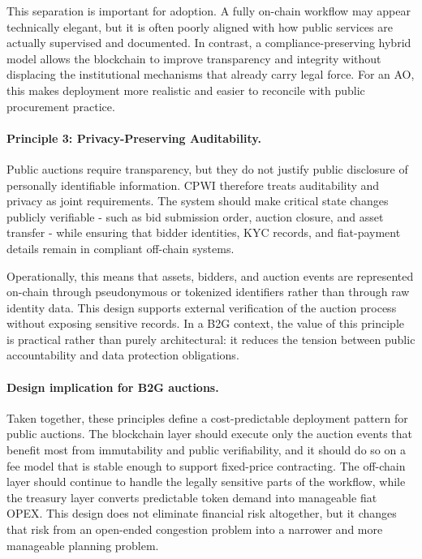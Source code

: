 \documentclass[runningheads]{llncs}
\begin{document}
This separation is important for adoption. A fully on-chain workflow may appear
technically elegant, but it is often poorly aligned with how public services are
actually supervised and documented. In contrast, a compliance-preserving hybrid
model allows the blockchain to improve transparency and integrity without
displacing the institutional mechanisms that already carry legal force. For an
AO, this makes deployment more realistic and easier to reconcile with public
procurement practice.

\paragraph{Principle 3: Privacy-Preserving Auditability.}
Public auctions require transparency, but they do not justify public disclosure of
personally identifiable information. CPWI therefore treats auditability and
privacy as joint requirements. The system should make critical state changes
publicly verifiable - such as bid submission order, auction closure, and asset
transfer - while ensuring that bidder identities, KYC records, and fiat-payment
details remain in compliant off-chain systems.

Operationally, this means that assets, bidders, and auction events are represented
on-chain through pseudonymous or tokenized identifiers rather than through raw
identity data. This design supports external verification of the auction process
without exposing sensitive records. In a B2G context, the value of this principle
is practical rather than purely architectural: it reduces the tension between
public accountability and data protection obligations.

\paragraph{Design implication for B2G auctions.}
Taken together, these principles define a cost-predictable deployment pattern for
public auctions. The blockchain layer should execute only the auction events that
benefit most from immutability and public verifiability, and it should do so on a
fee model that is stable enough to support fixed-price contracting. The off-chain
layer should continue to handle the legally sensitive parts of the workflow, while
the treasury layer converts predictable token demand into manageable fiat OPEX.
This design does not eliminate financial risk altogether, but it changes that risk
from an open-ended congestion problem into a narrower and more manageable
planning problem.
\end{document}

